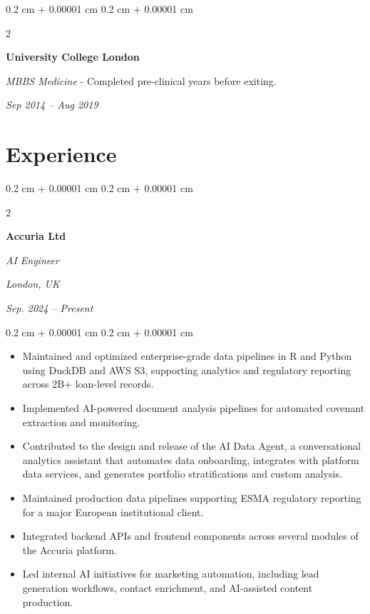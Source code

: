 \documentclass[10pt, letterpaper]{article}
\newenvironment{highlights}{
    \begin{itemize}[
        topsep=0.10 cm,
        parsep=0.10 cm,
        partopsep=0pt,
        itemsep=0pt,
        leftmargin=0.4 cm + 1pt
    ]
}{
    \end{itemize}
} %
\newenvironment{onecolentry}{
    \begin{adjustwidth}{
        0.2 cm + 0.00001 cm
    }{
        0.2 cm + 0.00001 cm
    }
}{
    \end{adjustwidth}
} %
\newenvironment{twocolentry}[2][]{
    \onecolentry
    \def\secondColumn{#2}
    \setcolumnwidth{\fill, 4.5 cm}
    \begin{paracol}{2}
}{
    \switchcolumn \raggedleft \secondColumn
    \end{paracol}
    \endonecolentry
} %
\begin{document}
        \vspace{0.08 cm}

        \begin{twocolentry}{
            
            
        \textit{Sep 2014 – Aug 2019}}
            \textbf{University College London}

            \textit{MBBS Medicine} - Completed pre-clinical years before exiting.
        \end{twocolentry}
         



    
    \section{Experience}



        
        \begin{twocolentry}{
    
        \textit{London, UK}
        
        \textit{Sep. 2024 – Present}}
            \textbf{Accuria Ltd}
            
            \textit{AI Engineer}
        \end{twocolentry}

        \vspace{0.08 cm}
        \begin{onecolentry}
            \begin{highlights}
    \item Maintained and optimized enterprise-grade data pipelines in R and Python using DuckDB and AWS S3, supporting analytics and regulatory reporting across 2B+ loan-level records.
    \item Implemented AI-powered document analysis pipelines for automated covenant extraction and monitoring.
    \item Contributed to the design and release of the AI Data Agent, a conversational analytics assistant that automates data onboarding, integrates with platform data services, and generates portfolio stratifications and custom analysis.
    \item Maintained production data pipelines supporting ESMA regulatory reporting for a major European institutional client.
    \item Integrated backend APIs  and frontend components across several modules of the Accuria platform.
    \item Led internal AI initiatives for marketing automation, including lead generation workflows, contact enrichment, and AI-assisted content production.
\end{highlights}
        \end{onecolentry}
\end{document}
